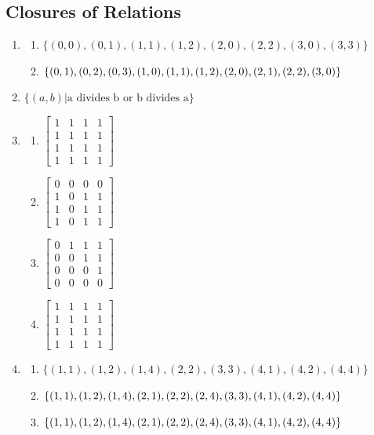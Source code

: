 \documentclass{sig-alternate-05-2015}
\begin{document}
\subsection{Closures of Relations}
\begin{enumerate}
\item 
	\begin{enumerate}
		\item $\{(0, 0), (0, 1), (1, 1), (1, 2), (2, 0), (2, 2), (3, 0), (3, 3)\}$
		\item $\{(0, 1), (0, 2), (0, 3), (1, 0), (1, 1), (1, 2), (2, 0), (2, 1),\\
			(2, 2), (3, 0)\}$
	\end{enumerate}

\item
$\{(a, b) | \text{a divides b or b divides a}\}$	

\item
	\begin{enumerate}
		\item 
		$\begin{bmatrix}
		1 & 1 & 1 & 1\\
		1 & 1 & 1 & 1\\
		1 & 1 & 1 & 1\\
		1 & 1 & 1 & 1
		\end{bmatrix}$
		\item
		$\begin{bmatrix}
		0 & 0 & 0 & 0\\
		1 & 0 & 1 & 1\\
		1 & 0 & 1 & 1\\
		1 & 0 & 1 & 1
		\end{bmatrix}$
		\item
		$\begin{bmatrix}
		0 & 1 & 1 & 1\\
		0 & 0 & 1 & 1\\
		0 & 0 & 0 & 1\\
		0 & 0 & 0 & 0
		\end{bmatrix}$
		\item
		$\begin{bmatrix}
		1 & 1 & 1 & 1\\
		1 & 1 & 1 & 1\\
		1 & 1 & 1 & 1\\
		1 & 1 & 1 & 1
		\end{bmatrix}$		
	\end{enumerate}

\item
	\begin{enumerate}
		\item $\{(1, 1), (1, 2),
			(1, 4), (2, 2), (3, 3), (4, 1), (4, 2), (4, 4)\}$
		\item $\{(1, 1),(1, 2), (1, 4), (2, 1), (2, 2), (2, 4),\\ (3, 3), (4, 1), (4, 2),
			(4, 4)\}$
		\item $\{(1, 1), (1, 2), (1, 4), (2, 1), (2, 2), (2, 4),\\ (3, 3),
			(4, 1), (4, 2), (4, 4)\}$
	\end{enumerate}


\end{enumerate}
\end{document}
